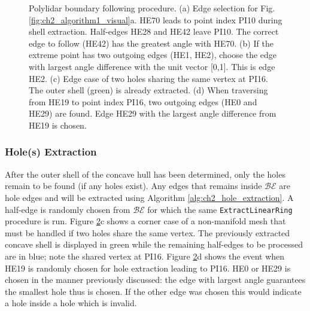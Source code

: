 \begin{figure}[ht]
\begin{subfigure}[t]{.25\linewidth}
    \caption{}
    \label{fig:ch2_example2_choice}
  \end{subfigure}
  \caption[Polylidar boundary following procedure]{Polylidar boundary following procedure. (a) Edge selection for Fig. \ref{fig:ch2_algorithm1_visual}a.  HE70 leads to point index PI10 during shell extraction. Half-edges HE28 and HE42 leave PI10. The correct edge to follow (HE42) has the greatest angle with HE70. (b) If the extreme point has two outgoing edges (HE1, HE2), choose the edge with largest angle difference with the unit vector [0,1]. This is edge HE2. (c) Edge case of two holes sharing the same vertex at PI16. The outer shell (green) is already extracted. (d) When traversing from HE19 to point index PI16, two outgoing edges (HE0 and HE29) are found. Edge HE29  with the largest angle difference from HE19 is chosen.}
  \label{fig:ch2_example1} 
\end{figure}


\subsubsection{Hole(s) Extraction}

After the outer shell of the concave hull has been determined, only the holes remain to be found (if any holes exist). Any edges that remains inside $\mathcal{BE}$ are hole edges and will be extracted using Algorithm \ref{alg:ch2_hole_extraction}.  A half-edge is randomly chosen from $\mathcal{BE}$ for which the same \texttt{ExtractLinearRing} procedure is run. Figure \ref{fig:ch2_example1}c shows a corner case of a non-manifold mesh that must be handled if two holes share the same vertex. The previously extracted concave shell is displayed in green while the remaining half-edges to be processed are in blue; note the shared vertex at PI16.  Figure \ref{fig:ch2_example1}d shows the event when HE19 is randomly chosen for hole extraction leading to PI16. HE0 or HE29 is chosen in the manner previously discussed: the edge with largest angle guarantees the smallest hole thus is chosen.  If the other edge was chosen this would indicate a hole inside a hole which is invalid.


